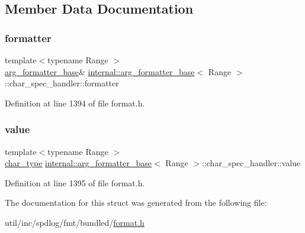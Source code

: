 \subsection{Member Data Documentation}
\mbox{\label{structinternal_1_1arg__formatter__base_1_1char__spec__handler_a85cadff96682e7cd84e67d9282bb20b5}} 
\subsubsection{\texorpdfstring{formatter}{formatter}}
{\footnotesize\ttfamily template$<$typename Range $>$ \\
\hyperlink{classinternal_1_1arg__formatter__base}{arg\+\_\+formatter\+\_\+base}\& \hyperlink{classinternal_1_1arg__formatter__base}{internal\+::arg\+\_\+formatter\+\_\+base}$<$ Range $>$\+::char\+\_\+spec\+\_\+handler\+::formatter}



Definition at line 1394 of file format.\+h.

\mbox{\label{structinternal_1_1arg__formatter__base_1_1char__spec__handler_a8cfc2ca86ce48c41abf2491020fb08cb}} 
\subsubsection{\texorpdfstring{value}{value}}
{\footnotesize\ttfamily template$<$typename Range $>$ \\
\hyperlink{classinternal_1_1arg__formatter__base_a407930bf282880d2ca45dfa8f5d2034b}{char\+\_\+type} \hyperlink{classinternal_1_1arg__formatter__base}{internal\+::arg\+\_\+formatter\+\_\+base}$<$ Range $>$\+::char\+\_\+spec\+\_\+handler\+::value}



Definition at line 1395 of file format.\+h.



The documentation for this struct was generated from the following file\+:\begin{DoxyCompactItemize}
\item 
util/inc/spdlog/fmt/bundled/\hyperlink{format_8h}{format.\+h}\end{DoxyCompactItemize}
